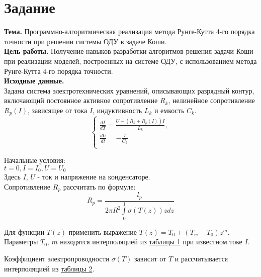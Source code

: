 \chapter*{Задание}

\qquad\textbf{Тема. } Программно-алгоритмическая реализация метода Рунге-Кутта 4-го порядка точности при решении системы ОДУ в задаче Коши.\\

\textbf{Цель работы. } Получение навыков разработки алгоритмов решения задачи Коши при реализации моделей, построенных на системе ОДУ, с использованием метода Рунге-Кутта
4-го порядка точности. \\

\textbf{Исходные данные. }\\
Задана система электротехнических уравнений, описывающих разрядный контур, включающий постоянное активное сопротивление $R_k$, нелинейное сопротивление $R_p(I)$, зависящее от тока $I$, индуктивность $L_k$ и емкость $C_k$.\\
\begin{equation}\label{formula1}
	\left\{
	\begin{array}{ccc}
		\frac{dI}{dT} = \frac{U - (R_k + R_p(I))I}{L_k},\\
		\frac{dU}{dt} = -\frac{I}{C_k}\\
	\end{array}
	\right.
\end{equation}

Начальные условия:\\
$t = 0, I = I_0, U = U_0$\\

Здесь $I$, $U$ - ток и напряжение на конденсаторе. \\
Сопротивление $R_p$ рассчитать по формуле:\\
\begin{equation}\label{formula2}
	R_p = \frac{l_p}{2\pi R^2 \int\limits_0^1 \sigma (T(z))zdz}
\end{equation}

Для функции $T(z)$ применить выражение $T(z) = T_0 + (T_w - T_0)z^m$.\\

Параметры $T_0$, $m$ находятся интерполяцией из \hyperref[table_1]{таблицы 1} при известном токе $I$.

Коэффициент электропроводности $\sigma(T)$ зависит от $T$ и рассчитывается интерполяцией из \hyperref[table_2]{таблицы 2}. \\

